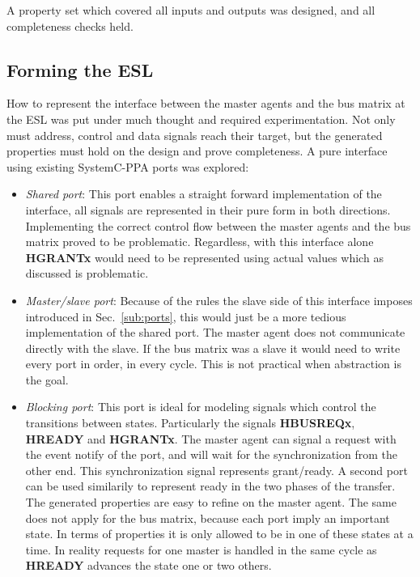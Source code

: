 A property set which covered all inputs and outputs was designed, and all completeness checks held.  

\subsection{Forming the ESL}
How to represent the interface between the master agents and the bus matrix at the ESL was put under much thought and required experimentation. Not only must address, control and data signals reach their target, but the generated properties must hold on the design and prove completeness. A pure interface using existing SystemC-PPA ports was explored: 
\begin{itemize}
  \item \textit{Shared port}: This port enables a straight forward implementation of the interface, all signals are represented in their pure form in both directions. Implementing the correct control flow between the master agents and the bus matrix proved to be problematic. Regardless, with this interface alone
\textbf{HGRANTx} would need to be represented using actual values which as discussed is problematic.  
 \item \textit{Master/slave port}: Because of the rules the slave side of this interface imposes introduced in Sec.~\ref{sub:ports}, this would just be a more tedious implementation of the shared port. The master agent does not communicate directly with the slave. If the bus matrix was a slave it would need to write every port in order, in every cycle. This is not practical when abstraction is the goal. 
 \item \textit{Blocking port}: This port is ideal for modeling signals which control the transitions between states. Particularly the signals \textbf{HBUSREQx}, 
\textbf{HREADY} and \textbf{HGRANTx}. The master agent can signal a request with the event notify of the port, and will wait for the synchronization from the other end. This synchronization signal represents grant/ready. A second port can be used similarily to represent ready in the two phases of the transfer. The generated properties are easy to refine on the master agent. The same does not apply for the bus matrix, because each port imply an important state. In terms of properties it is only allowed to be in one of these states at a time. In reality requests for one master is handled in the same cycle as \textbf{HREADY} advances the state one or two others.  
\end{itemize}

